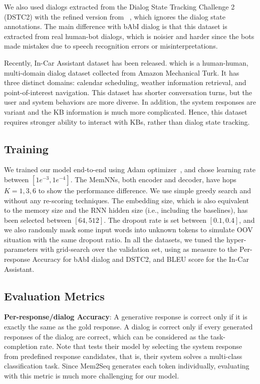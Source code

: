\documentclass[11pt,a4paper]{article}
\begin{document}
We also used dialogs extracted from the Dialog State Tracking Challenge 2 (DSTC2) with the refined version from ~\citet{bordes2016learning}, which ignores the dialog state annotations. The main difference with bAbI dialog is that this dataset is extracted from real human-bot dialogs, which is noisier and harder since the bots made mistakes due to speech recognition errors or misinterpretations.

Recently, In-Car Assistant dataset has been released. which is a human-human, multi-domain dialog dataset collected from Amazon Mechanical Turk. It has three distinct domains: calendar scheduling, weather information retrieval, and point-of-interest navigation. This dataset has shorter conversation turns, but the user and system behaviors are more diverse. In addition, the system responses are variant and the KB information is much more complicated. Hence, this dataset requires stronger ability to interact with KBs, rather than dialog state tracking. 

\subsection{Training}
We trained our model end-to-end using Adam optimizer~\cite{KingmaB14}, and chose learning rate between $[1e^{-3},1e^{-4}]$. The MemNNs, both encoder and decoder, have hops $K= 1,3, 6$ to show the performance difference. We use simple greedy search and without any re-scoring techniques. The embedding size, which is also equivalent to the memory size and the RNN hidden size (i.e., including the baselines), has been selected between $[64,512]$. The dropout rate is set between $[0.1, 0.4]$, and we also randomly mask some input words into unknown tokens to simulate OOV situation with the same dropout ratio. In all the datasets, we tuned the hyper-parameters with grid-search over the validation set, using as measure to the Per-response Accuracy for bAbI dialog and DSTC2, and BLEU score for the In-Car Assistant. 


\subsection{Evaluation Metrics}
\textbf{Per-response/dialog Accuracy}: 
A generative response is correct only if it is exactly the same as the gold response. A dialog is correct only if every generated responses of the dialog are correct, which can be considered as the task-completion rate. Note that \citet{bordes2016learning} tests their model by selecting the system response from predefined response candidates, that is, their system solves a multi-class classification task. Since Mem2Seq generates each token individually, evaluating with this metric is much more challenging for our model.
\end{document}
